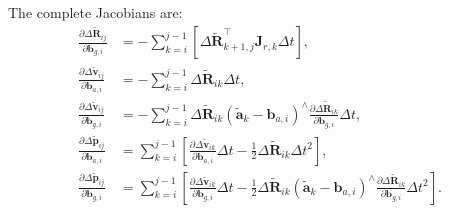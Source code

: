 The complete Jacobians are:
\begin{subequations}\label{eq:preinteg-jacob-bias}
	\begin{align}
		\frac{\partial \Delta \tilde{\mathbf{R}}_{ij}}{\partial \mathbf{b}_{g,i}} &= -\sum_{k=i}^{j-1} \left[\Delta 
		\tilde{\mathbf{R}}_{k+1, j}^\top \mathbf{J}_{r,k} \Delta t \right], \\
		\frac{\partial \Delta \tilde{\mathbf{v}}_{ij}}{\partial \mathbf{b}_{a,i}} &= -\sum_{k=i}^{j-1} \Delta 
		\tilde{\mathbf{R}}_{ik} \Delta t, \\
		\frac{\partial \Delta \tilde{\mathbf{v}}_{ij}}{\partial \mathbf{b}_{g,i}} &= -\sum_{k=i}^{j-1} \Delta 
		\tilde{\mathbf{R}}_{ik} \left( \tilde{\mathbf{a}}_k - \mathbf{b}_{a,i} \right)^\wedge \frac{\partial \Delta 
			\tilde{\mathbf{R}}_{ik}}{\partial \mathbf{b}_{g,i}} \Delta t, \\
		\frac{\partial \Delta \tilde{\mathbf{p}}_{ij}}{\partial \mathbf{b}_{a,i}} &= \sum_{k=i}^{j-1} \left[\frac{\partial 
			\Delta \tilde{\mathbf{v}}_{ik}}{\partial \mathbf{b}_{a,i}}  \Delta t - \frac{1}{2} \Delta \tilde{\mathbf{R}}_{ik} \Delta t^2 
		\right], \\
		\frac{\partial \Delta \tilde{\mathbf{p}}_{ij}}{\partial \mathbf{b}_{g,i}} &= \sum_{k=i}^{j-1} \left[\frac{\partial 
			\Delta \tilde{\mathbf{v}}_{ik}}{\partial \mathbf{b}_{g,i}} \Delta t -\frac{1}{2} \Delta 
		\tilde{\mathbf{R}}_{ik}\left(\tilde{\mathbf{a}}_{k}-\mathbf{b}_{a,i}\right)^\wedge  \frac{\partial \Delta 
			\tilde{\mathbf{R}}_{ik}}{\partial \mathbf{b}_{g,i}} \Delta t^2 \right]. 
	\end{align}
\end{subequations}

